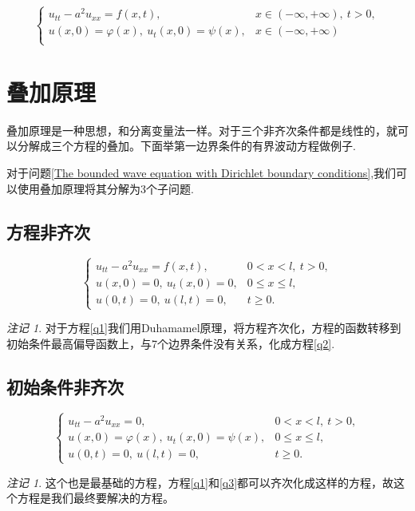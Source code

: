 \documentclass[12pt,a4paper]{article}
\numberwithin{subsection}{section}   %
\numberwithin{subsubsection}{subsection}
\theoremstyle{plain}
\theoremstyle{definition}
\theoremstyle{remark}
\newtheorem{remark}[theorem]{注记}
\theoremstyle{remark}
\begin{document}
	\begin{equation}\label{The unbounded wave equation}
		\begin{cases}
			u_{tt} - a^2 u_{xx} = f(x, t), &  x \in (-\infty , +\infty), \ t > 0, \\
			u(x, 0) = \varphi(x), \ u_t(x, 0) = \psi(x), & x \in (-\infty , +\infty) \\
		\end{cases}
	\end{equation}
	
	
	
		\newpage
	\section{叠加原理}
	叠加原理是一种思想，和分离变量法一样。对于三个非齐次条件都是线性的，就可以分解成三个方程的叠加。下面举第一边界条件的有界波动方程做例子.
	
	对于问题\eqref{The bounded wave equation with Dirichlet boundary conditions},我们可以使用叠加原理将其分解为3个子问题.
		\subsection{方程非齐次}
				\begin{equation}\label{q1}
		\begin{cases}
			u_{tt} - a^2 u_{xx} = f(x, t), & 0 < x < l, \ t > 0, \\
			u(x, 0) = 0, \ u_t(x, 0) = 0, & 0 \leq x \leq l, \\
			u(0, t) = 0, \ u(l, t) = 0, & t \geq 0.
		\end{cases}
	\end{equation}
	\begin{remark}
	对于方程\eqref{q1}我们用Duhamamel原理，将方程齐次化，方程的函数转移到初始条件最高偏导函数上，与7个边界条件没有关系，化成方程\eqref{q2}.
	\end{remark}
		
	\subsection{初始条件非齐次}
		\begin{equation}\label{q2}
			\begin{cases}
				u_{tt} - a^2 u_{xx} = 0, & 0 < x < l, \ t > 0, \\
				u(x, 0) = \varphi(x), \ u_t(x, 0) = \psi(x), & 0 \leq x \leq l, \\
				u(0, t) = 0, \ u(l, t) = 0, & t \geq 0.
			\end{cases}
		\end{equation}
\begin{remark}
	这个也是最基础的方程，方程\eqref{q1}和\eqref{q3}都可以齐次化成这样的方程，故这个方程是我们最终要解决的方程。
\end{remark}
	
\end{document}
